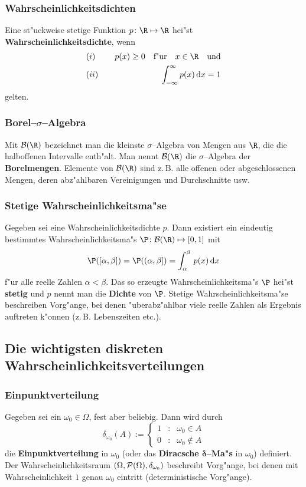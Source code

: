 \subsubsection{Wahrscheinlichkeitsdichten}
Eine st"uckweise stetige Funktion $p\colon\R\mapsto\R$ hei"st
\textbf{Wahrscheinlichkeitsdichte}, wenn
\begin{eqnarray*}
&(i)&\quad p(x)\ge 0\quad\mbox{f"ur}\quad x\in\R\quad \mbox{und}\\
&(ii)&\quad\int_{-\infty}^\infty p(x)\,\mathrm d x=1
\end{eqnarray*}
gelten.
\subsubsection{Borel--$\sigma$--Algebra}
Mit $\fr B(\R)$ bezeichnet man die kleinste $\sigma$--Algebra von Mengen aus $\R$, die
die halboffenen Intervalle enth"alt. Man nennt $\fr B(\R)$ die $\sigma$--Algebra der
\textbf{Borelmengen}. Elemente von $\fr B(\R)$ sind z.\,B. alle offenen oder abgeschlossenen Mengen,
deren abz"ahlbaren Vereinigungen und Durchschnitte usw.
\subsubsection{Stetige Wahrscheinlichkeitsma"se}
Gegeben sei eine Wahrscheinlichkeitsdichte $p$. Dann existiert ein eindeutig bestimmtes
Wahrscheinlichkeitsma"s $\P \colon\fr B(\R)\mapsto [0,1]$ mit
$$
\P([\alpha,\beta])=\P((\alpha,\beta])=\int_\alpha^\beta\,p(x)\,\mathrm dx
$$
f"ur alle reelle Zahlen $\alpha<\beta$. Das so erzeugte Wahrscheinlichkeitsma"s $\P$ hei"st \textbf{stetig}
und $p$ nennt man die \textbf{Dichte} von $\P$. Stetige Wahrscheinlichkeitsma"se beschreiben Vorg"ange,
bei denen "uberabz"ahlbar viele reelle Zahlen als Ergebnis auftreten k"onnen (z.\,B. Lebenszeiten etc.).
\subsection{Die wichtigsten diskreten Wahrscheinlichkeitsverteilungen}

\subsubsection{Einpunktverteilung}
Gegeben sei ein $\omega_0\in \Omega$, fest aber beliebig. Dann wird
durch
$$
\delta_{\omega_0}(A):=\left\{
\begin{array}{rcl}
1 &:& \omega_0\in A\\
0 &:& \omega_0\notin A
\end{array}
\right.
$$
die \textbf{Einpunktverteilung} in $\omega_0$ (oder das \textbf{Diracsche $\mathbf \delta$--Ma"s} in
$\omega_0$) definiert. Der Wahrscheinlichkeitsraum $(\Omega,\mathcal P(\Omega),\delta_{\omega_0})$
beschreibt Vorg"ange, bei denen mit Wahrscheinlichkeit $1$ genau $\omega_0$ eintritt (deterministische
Vorg"ange).



